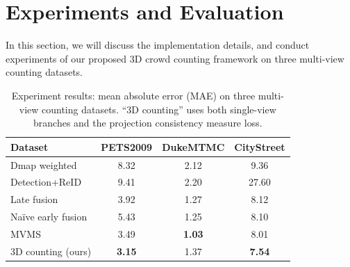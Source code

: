 \documentclass[letterpaper]{article} %
\newcommand{\citep}{\cite}
\begin{document}
\section{Experiments and Evaluation}
In this section, we will discuss the implementation details, and conduct experiments of our proposed 3D crowd counting framework on three multi-view counting datasets.


\begin{table}
\small
\centering
\begin{tabular}{l|c|c|c}
\hline
    Dataset        & PETS2009      &DukeMTMC    &CityStreet   \\
\hline
    Dmap weighted  & 8.32                                      & 2.12                             & 9.36   \\
    Detection+ReID & 9.41                                       & 2.20                             & 27.60   \\
\hline
    Late fusion \citep{zhang2019wide}         & 3.92             & 1.27                             & 8.12    \\
    Na\"ive early fusion \citep{zhang2019wide} & 5.43             & 1.25                             & 8.10   \\
    MVMS \citep{zhang2019wide}                  &3.49              &\textbf{1.03}                     & 8.01   \\
\hline
    3D counting (ours)                        &\textbf{3.15}        &1.37                           & \textbf{7.54} \\
\hline
\end{tabular}
\caption{Experiment results: mean absolute error (MAE) on three multi-view counting datasets. ``3D counting'' uses both single-view branches and the projection consistency measure loss.}
\label{table:results}
\end{table}




\end{document}
